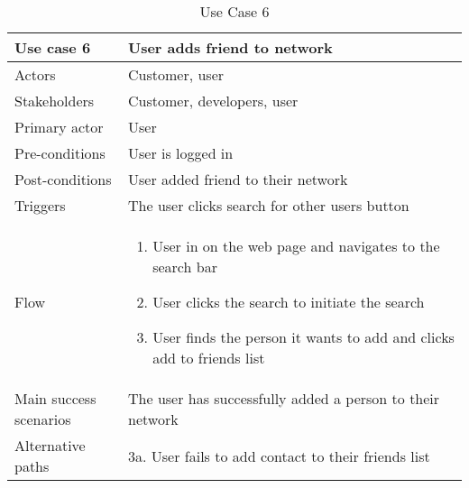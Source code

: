 \begin{table}[H]
\begin{tabular}{ | L{0.25\linewidth} | L{0.75\linewidth} | } 
 \hline {}
 Use case 6 & User adds friend to network  \\ 
 \hline
 Actors & Customer, user \\ 
 \hline
 Stakeholders & Customer, developers, user \\ 
  \hline
 Primary actor & User  \\ 
 \hline
 Pre-conditions & User is logged in \\ 
 \hline
 Post-conditions & User added friend to their network \\ 
  \hline
 Triggers & The user clicks search for other users button  \\ 
 \hline
Flow & 
    \vspace{-5mm}
    \begin{enumerate}[noitemsep]
  \item User in on the web page and navigates to the search bar
  \item User clicks the search to initiate the search
  \item User finds the person it wants to add and clicks add to friends list
   \end{enumerate}\\ 
 \hline
 Main success scenarios & The user has successfully added a person to their network \\ 
 \hline
 Alternative paths & 3a. User fails to add contact to their friends list\\
 \hline
\end{tabular}
\caption{Use Case 6}
\end{table}



